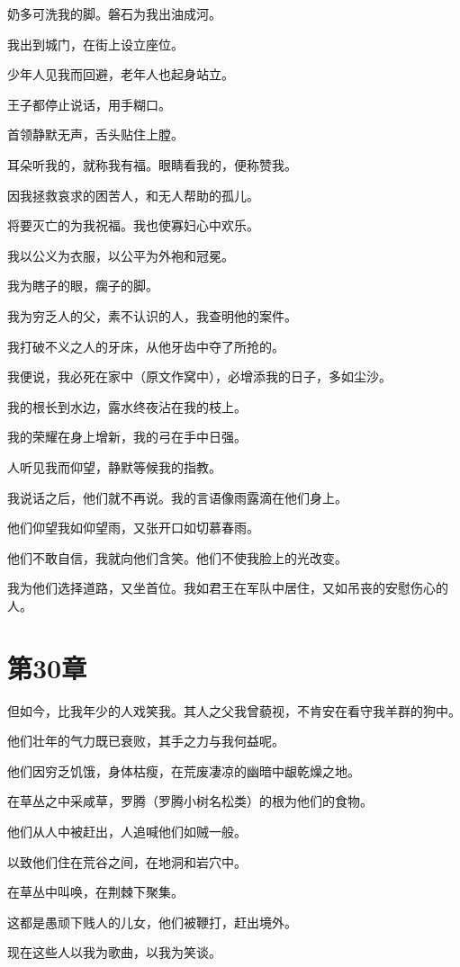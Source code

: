 \documentclass[12pt,oneside]{book}
\begin{document}
奶多可洗我的脚。磐石为我出油成河。

我出到城门，在街上设立座位。

少年人见我而回避，老年人也起身站立。

王子都停止说话，用手糊口。

首领静默无声，舌头贴住上膛。

耳朵听我的，就称我有福。眼睛看我的，便称赞我。

因我拯救哀求的困苦人，和无人帮助的孤儿。

将要灭亡的为我祝福。我也使寡妇心中欢乐。

我以公义为衣服，以公平为外袍和冠冕。

我为瞎子的眼，瘸子的脚。

我为穷乏人的父，素不认识的人，我查明他的案件。

我打破不义之人的牙床，从他牙齿中夺了所抢的。

我便说，我必死在家中（原文作窝中），必增添我的日子，多如尘沙。

我的根长到水边，露水终夜沾在我的枝上。

我的荣耀在身上增新，我的弓在手中日强。

人听见我而仰望，静默等候我的指教。

我说话之后，他们就不再说。我的言语像雨露滴在他们身上。

他们仰望我如仰望雨，又张开口如切慕春雨。

他们不敢自信，我就向他们含笑。他们不使我脸上的光改变。

我为他们选择道路，又坐首位。我如君王在军队中居住，又如吊丧的安慰伤心的人。


\chapter{第30章}
但如今，比我年少的人戏笑我。其人之父我曾藐视，不肯安在看守我羊群的狗中。

他们壮年的气力既已衰败，其手之力与我何益呢。

他们因穷乏饥饿，身体枯瘦，在荒废凄凉的幽暗中龈乾燥之地。

在草丛之中采咸草，罗腾（罗腾小树名松类）的根为他们的食物。

他们从人中被赶出，人追喊他们如贼一般。

以致他们住在荒谷之间，在地洞和岩穴中。

在草丛中叫唤，在荆棘下聚集。

这都是愚顽下贱人的儿女，他们被鞭打，赶出境外。

现在这些人以我为歌曲，以我为笑谈。
\end{document}
